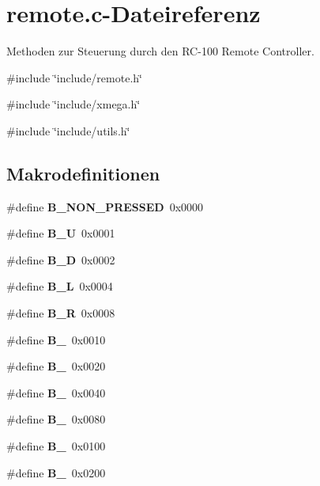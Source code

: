 \section{remote.c-\/Dateireferenz}
\label{remote_8c}


Methoden zur Steuerung durch den RC-\/100 Remote Controller.  


{\ttfamily \#include \char`\"{}include/remote.h\char`\"{}}\par
{\ttfamily \#include \char`\"{}include/xmega.h\char`\"{}}\par
{\ttfamily \#include \char`\"{}include/utils.h\char`\"{}}\par
\subsection*{Makrodefinitionen}
\begin{DoxyCompactItemize}
\item 
\#define {\bf B\_\-NON\_\-PRESSED}~0x0000
\item 
\#define {\bf B\_\-U}~0x0001
\item 
\#define {\bf B\_\-D}~0x0002
\item 
\#define {\bf B\_\-L}~0x0004
\item 
\#define {\bf B\_\-R}~0x0008
\item 
\#define {\bf B\_}~0x0010
\item 
\#define {\bf B\_}~0x0020
\item 
\#define {\bf B\_}~0x0040
\item 
\#define {\bf B\_}~0x0080
\item 
\#define {\bf B\_}~0x0100
\item 
\#define {\bf B\_}~0x0200
\end{DoxyCompactItemize}
